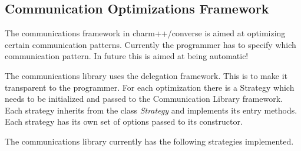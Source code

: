 \subsection{Communication Optimizations Framework}

The communications framework in charm++/converse is aimed at
optimizing certain communication patterns. Currently the programmer
has to specify which communication pattern. In future this is aimed at
being automatic!

The communications library uses the delegation framework. This is to
make it transparent to the programmer. For each optimization there is
a Strategy which needs to be initialized and passed to the
Communication Library framework. Each strategy inherits from the class
{\em Strategy} and implements its entry methods.  Each strategy has
its own set of options passed to its constructor.

The communications library currently has the following strategies implemented.

